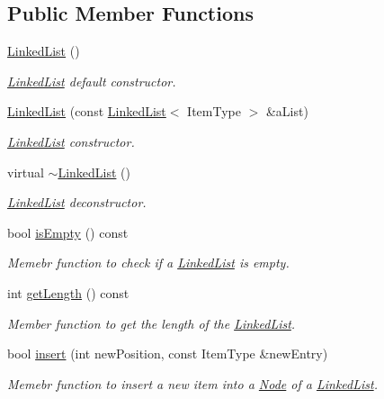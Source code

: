 \subsection*{Public Member Functions}
\begin{DoxyCompactItemize}
\item 
\hyperlink{classLinkedList_adf8d8164e06b6d358a36df7e53e814ee}{Linked\+List} ()
\begin{DoxyCompactList}\small\item\em \hyperlink{classLinkedList}{Linked\+List} default constructor. \end{DoxyCompactList}\item 
\hyperlink{classLinkedList_a6f1443c6120352f1f5b6bd3c0d95e41e}{Linked\+List} (const \hyperlink{classLinkedList}{Linked\+List}$<$ Item\+Type $>$ \&a\+List)
\begin{DoxyCompactList}\small\item\em \hyperlink{classLinkedList}{Linked\+List} constructor. \end{DoxyCompactList}\item 
virtual \hyperlink{classLinkedList_a66aee17d756fe0e002375897383c180b}{$\sim$\+Linked\+List} ()
\begin{DoxyCompactList}\small\item\em \hyperlink{classLinkedList}{Linked\+List} deconstructor. \end{DoxyCompactList}\item 
bool \hyperlink{classLinkedList_a008e916c3d51d28b4cc9c8cdf3e9d921}{is\+Empty} () const
\begin{DoxyCompactList}\small\item\em Memebr function to check if a \hyperlink{classLinkedList}{Linked\+List} is empty. \end{DoxyCompactList}\item 
int \hyperlink{classLinkedList_a61d045ef6008b494a1a516ecc992c0e7}{get\+Length} () const
\begin{DoxyCompactList}\small\item\em Member function to get the length of the \hyperlink{classLinkedList}{Linked\+List}. \end{DoxyCompactList}\item 
bool \hyperlink{classLinkedList_ae8a19375505e87e2e4fc0e9b5afe4d4d}{insert} (int new\+Position, const Item\+Type \&new\+Entry)
\begin{DoxyCompactList}\small\item\em Memebr function to insert a new item into a \hyperlink{classNode}{Node} of a \hyperlink{classLinkedList}{Linked\+List}. \end{DoxyCompactList}\item 

\end{DoxyCompactItemize}

